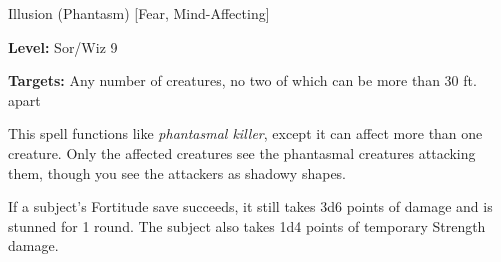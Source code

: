 
Illusion (Phantasm) [Fear, Mind-Affecting]

\textbf{Level:} Sor/Wiz 9

\textbf{Targets:} Any number of creatures, no two of which can be more than 30 
ft. apart

This spell functions like \textit{phantasmal killer}, except it can affect more 
than one creature. Only the affected creatures see the phantasmal creatures attacking 
them, though you see the attackers as shadowy shapes.

If a subject's Fortitude save succeeds, it still takes 3d6 points of damage and 
is stunned for 1 round. The subject also takes 1d4 points of temporary Strength 
damage.

